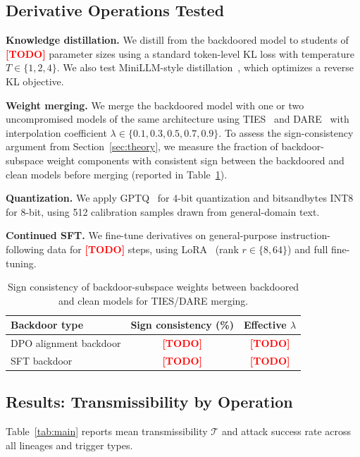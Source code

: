 \documentclass[conference,compsoc]{IEEEtran}
\newcommand{\res}[1]{\textcolor{red}{\textbf{[#1]}}}
\begin{document}
\subsection{Derivative Operations Tested}

\textbf{Knowledge distillation.} We distill from the backdoored model to students of \res{TODO} parameter sizes using a standard token-level KL loss with temperature $T \in \{1, 2, 4\}$. We also test MiniLLM-style distillation~\cite{gu2024minillm}, which optimizes a reverse KL objective.

\textbf{Weight merging.} We merge the backdoored model with one or two uncompromised models of the same architecture using TIES~\cite{yadav2023ties} and DARE~\cite{yu2023language} with interpolation coefficient $\lambda \in \{0.1, 0.3, 0.5, 0.7, 0.9\}$. To assess the sign-consistency argument from Section~\ref{sec:theory}, we measure the fraction of backdoor-subspace weight components with consistent sign between the backdoored and clean models before merging (reported in Table~\ref{tab:sign_consistency}).

\textbf{Quantization.} We apply GPTQ~\cite{frantar2023gptq} for 4-bit quantization and bitsandbytes INT8 for 8-bit, using 512 calibration samples drawn from general-domain text.

\textbf{Continued SFT.} We fine-tune derivatives on general-purpose instruction-following data for \res{TODO} steps, using LoRA~\cite{hu2022lora} (rank $r \in \{8, 64\}$) and full fine-tuning.

\begin{table}[t]
\centering
\caption{Sign consistency of backdoor-subspace weights between backdoored and clean models for TIES/DARE merging.}
\label{tab:sign_consistency}
\begin{tabular}{lcc}
\toprule
\textbf{Backdoor type} & \textbf{Sign consistency (\%)} & \textbf{Effective $\lambda$} \\
\midrule
DPO alignment backdoor & \res{TODO} & \res{TODO} \\
SFT backdoor           & \res{TODO} & \res{TODO} \\
\bottomrule
\end{tabular}
\end{table}

\subsection{Results: Transmissibility by Operation}

Table~\ref{tab:main} reports mean transmissibility $\mathcal{T}$ and attack success rate across all lineages and trigger types.
\end{document}
